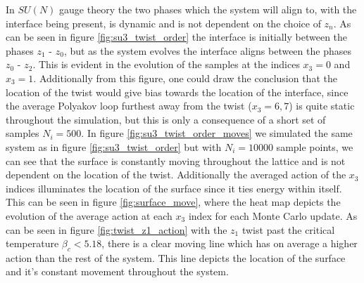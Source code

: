 \documentclass[english,twoside,openright]{UH_TCM_MSc}
\begin{document}
In $SU(N)$ gauge theory the two phases which the system will align to, with the interface being present, is dynamic and is not dependent on the choice of $z_n$. As can be seen in figure \ref{fig:su3_twist_order} the interface is initially between the phases $z_1$ - $z_0$, but as the system evolves the interface aligns between the phases $z_0$ - $z_2$. This is evident in the evolution of the samples at the indices $x_3 = 0$ and $x_3 = 1$. Additionally from this figure, one could draw the conclusion that the location of the twist would give bias towards the location of the interface, since the average Polyakov loop furthest away from the twist ($x_3=6,7$) is quite static throughout the simulation, but this is only a consequence of a short set of samples $N_i = 500$. In figure \ref{fig:su3_twist_order_moves} we simulated the same system as in figure \ref{fig:su3_twist_order} but with $N_i = 10000$ sample points, we can see that the surface is constantly moving throughout the lattice and is not dependent on the location of the twist. Additionally the averaged action of the $x_3$ indices illuminates the location of the surface since it ties energy within itself. This can be seen in figure \ref{fig:surface_move}, where the heat map depicts the evolution of the average action at each $x_3$ index for each Monte Carlo update. As can be seen in figure \ref{fig:twist_z1_action} with the $z_1$ twist past the critical temperature $\beta_c < 5.18$, there is a clear moving line which has on average a higher action than the rest of the system. This line depicts the location of the surface and it's constant movement throughout the system.
\end{document}
